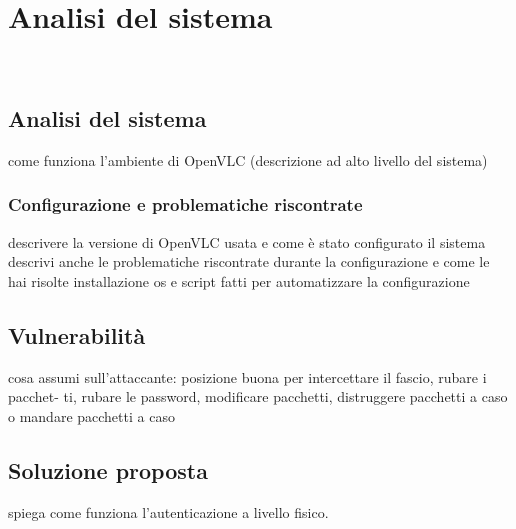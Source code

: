\chapter{Analisi del sistema}
\label{cap:analisi}

\\

\section{Analisi del sistema}
come funziona l'ambiente di OpenVLC (descrizione ad alto livello del sistema)
\subsection{Configurazione e problematiche riscontrate}
descrivere la versione di OpenVLC usata e come è stato configurato il sistema
descrivi anche le problematiche riscontrate durante la configurazione e come le hai risolte
installazione os e script fatti per automatizzare la configurazione

\section{Vulnerabilità}
cosa assumi sull'attaccante: posizione buona per intercettare il fascio, rubare i pacchet-
ti, rubare le password, modificare pacchetti, distruggere pacchetti a caso o mandare
pacchetti a caso

\section{Soluzione proposta}
spiega come funziona l'autenticazione a livello fisico.
